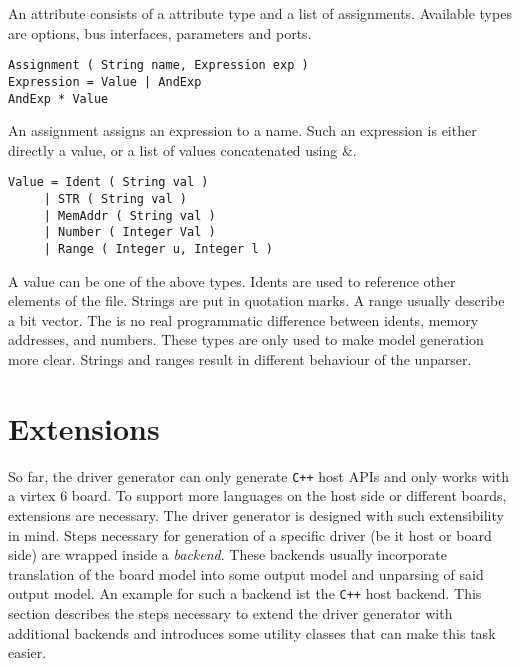 \documentclass{report}
\begin{document}
An attribute consists of a attribute type and a list of assignments. Available types are options, bus interfaces, parameters and ports.

\begin{lstlisting}
Assignment ( String name, Expression exp )
Expression = Value | AndExp
AndExp * Value
\end{lstlisting}

An assignment assigns an expression to a name. Such an expression is either directly a value, or a list of values concatenated using \&. %

\begin{lstlisting}
Value = Ident ( String val )
     | STR ( String val )
     | MemAddr ( String val )
     | Number ( Integer Val )
     | Range ( Integer u, Integer l )
\end{lstlisting}

A value can be one of the above types. Idents are used to reference other elements of the file. Strings are put in quotation marks. A range usually describe a bit vector.
The is no real programmatic difference between idents, memory addresses, and numbers. These types are only used to make model generation more clear. Strings and ranges result in different behaviour of the unparser.

\section{Extensions}
So far, the driver generator can only generate \texttt{C++} host APIs and only works with a virtex 6 board. To support more languages on the host side or different boards, extensions are necessary. The driver generator is designed with such extensibility in mind. Steps necessary for generation of a specific driver (be it host or board side) are wrapped inside a \textit{backend}. These backends usually incorporate translation of the board model into some output model and unparsing of said output model. An example for such a backend ist the \texttt{C++} host backend. This section describes the steps necessary to extend the driver generator with additional backends and introduces some utility classes that can make this task easier. 
\end{document}
